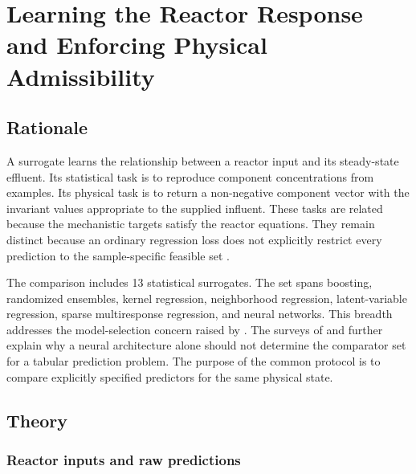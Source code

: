 \chapter{Learning the Reactor Response and Enforcing Physical Admissibility}
\label{ch:projection}

\section{Rationale}

A surrogate learns the relationship between a reactor input and its steady-state effluent. Its statistical task is to reproduce component concentrations from examples. Its physical task is to return a non-negative component vector with the invariant values appropriate to the supplied influent. These tasks are related because the mechanistic targets satisfy the reactor equations. They remain distinct because an ordinary regression loss does not explicitly restrict every prediction to the sample-specific feasible set \citep{Kashinath2021,Hansen2024}.

The comparison includes 13 statistical surrogates. The set spans boosting, randomized ensembles, kernel regression, neighborhood regression, latent-variable regression, sparse multiresponse regression, and neural networks. This breadth addresses the model-selection concern raised by \citet{BhosekarIerapetritou2018}. The surveys of \citet{Borisov2024} and \citet{ShwartzZiv2022} further explain why a neural architecture alone should not determine the comparator set for a tabular prediction problem. The purpose of the common protocol is to compare explicitly specified predictors for the same physical state.

\section{Theory}

\subsection{Reactor inputs and raw predictions}

